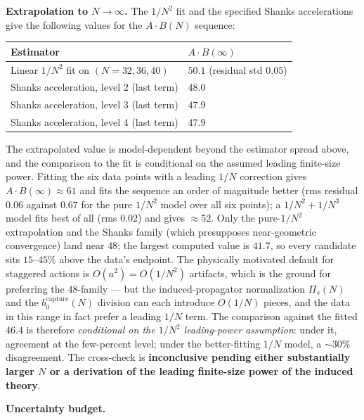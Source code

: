 \documentclass[
]{article}
\begin{document}
\textbf{Extrapolation to \(N \to \infty\).} The \(1/N^2\) fit and the
specified Shanks accelerations give the following values for the
\(A \cdot B(N)\) sequence:

\begin{longtable}[]{@{}ll@{}}
\toprule\noalign{}
Estimator & \(A \cdot B(\infty)\) \\
\midrule\noalign{}
\endhead
\bottomrule\noalign{}
\endlastfoot
Linear \(1/N^2\) fit on \((N=32,36,40)\) & \(50.1\) (residual std
\(0.05\)) \\
Shanks acceleration, level 2 (last term) & \(48.0\) \\
Shanks acceleration, level 3 (last term) & \(47.9\) \\
Shanks acceleration, level 4 (last term) & \(47.9\) \\
\end{longtable}

The extrapolated value is model-dependent beyond the estimator spread
above, and the comparison to the fit is conditional on the assumed
leading finite-size power. Fitting the six data points with a leading
\(1/N\) correction gives \(A \cdot B(\infty) \approx 61\) and fits the
sequence an order of magnitude better (rms residual \(0.06\) against
\(0.67\) for the pure \(1/N^2\) model over all six points); a
\(1/N^2 + 1/N^3\) model fits best of all (rms \(0.02\)) and gives
\(\approx 52\). Only the pure-\(1/N^2\) extrapolation and the Shanks
family (which presupposes near-geometric convergence) land near \(48\);
the largest computed value is \(41.7\), so every candidate sits
\(15\)--\(45\%\) above the data's endpoint. The physically motivated
default for staggered actions is \(O(a^2) = O(1/N^2)\) artifacts, which
is the ground for preferring the \(48\)-family --- but the
induced-propagator normalization \(\Pi_s(N)\) and the
\(b_0^{\text{capture}}(N)\) division can each introduce \(O(1/N)\)
pieces, and the data in this range in fact prefer a leading \(1/N\)
term. The comparison against the fitted \(46.4\) is therefore
\emph{conditional on the \(1/N^2\) leading-power assumption}: under it,
agreement at the few-percent level; under the better-fitting \(1/N\)
model, a \(\sim 30\%\) disagreement. The cross-check is
\textbf{inconclusive pending either substantially larger \(N\) or a
derivation of the leading finite-size power of the induced theory}.

\textbf{Uncertainty budget.}
\end{document}

